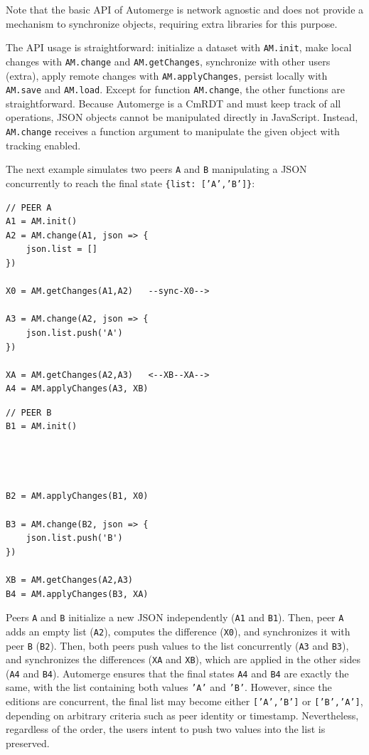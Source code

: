 \documentclass[12pt]{article}
\newcommand{\code}[1]  {\texttt{\footnotesize{#1}}}
\begin{document}
Note that the basic API of Automerge is network agnostic and does not provide
a mechanism to synchronize objects, requiring extra libraries for this purpose.

The API usage is straightforward:
    initialize a dataset with \code{AM.init},
    make local changes with \code{AM.change} and \code{AM.getChanges},
    synchronize with other users (extra),
    apply remote changes with \code{AM.applyChanges},
    persist locally with \code{AM.save} and \code{AM.load}.
Except for function \code{AM.change}, the other functions are straightforward.
%
Because Automerge is a CmRDT and must keep track of all operations, JSON
objects cannot be manipulated directly in JavaScript.
Instead, \code{AM.change} receives a function argument to manipulate
the given object with tracking enabled.

The next example simulates two peers \code{A} and \code{B} manipulating a
JSON concurrently to reach the final state \code{\{list:~['A','B']\}}:

\noindent
{\footnotesize
\begin{minipage}[t]{0.6\textwidth}
\begin{verbatim}
// PEER A
A1 = AM.init()
A2 = AM.change(A1, json => {
    json.list = []
})

X0 = AM.getChanges(A1,A2)   --sync-X0-->

A3 = AM.change(A2, json => {
    json.list.push('A')
})

XA = AM.getChanges(A2,A3)   <--XB--XA-->
A4 = AM.applyChanges(A3, XB)
\end{verbatim}
\end{minipage}
\begin{minipage}[t]{0.4\textwidth}
\begin{verbatim}
// PEER B
B1 = AM.init()




B2 = AM.applyChanges(B1, X0)

B3 = AM.change(B2, json => {
    json.list.push('B')
})

XB = AM.getChanges(A2,A3)
B4 = AM.applyChanges(B3, XA)
\end{verbatim}
\end{minipage}
}

Peers \code{A} and \code{B} initialize a new JSON independently (\code{A1} and
\code{B1}).
Then, peer \code{A} adds an empty list (\code{A2}), computes the difference
(\code{X0}), and synchronizes it with peer \code{B} (\code{B2}).
Then, both peers push values to the list concurrently (\code{A3} and
\code{B3}), and synchronizes the differences (\code{XA} and \code{XB}), which
are applied in the other sides (\code{A4} and \code{B4}).
Automerge ensures that the final states \code{A4} and \code{B4} are exactly the
same, with the list containing both values \code{'A'} and \code{'B'}.
However, since the editions are concurrent, the final list may become either
\code{['A','B']} or \code{['B','A']}, depending on arbitrary criteria such as
peer identity or timestamp.
Nevertheless, regardless of the order, the users intent to push two values into
the list is preserved.
\end{document}
